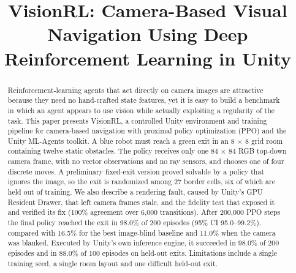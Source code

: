 \documentclass[conference]{IEEEtran}
\begin{document}
\title{VisionRL: Camera-Based Visual Navigation Using Deep Reinforcement Learning in Unity}

\author{
\and
{}
\and
{}
}

\maketitle

\begin{abstract}
Reinforcement-learning agents that act directly on camera images are attractive because they need no hand-crafted state features, yet it is easy to build a benchmark in which an agent appears to use vision while actually exploiting a regularity of the task. This paper presents VisionRL, a controlled Unity environment and training pipeline for camera-based navigation with proximal policy optimization (PPO) and the Unity ML-Agents toolkit. A blue robot must reach a green exit in an 8 $\times$ 8 grid room containing twelve static obstacles. The policy receives only one 84 $\times$ 84 RGB top-down camera frame, with no vector observations and no ray sensors, and chooses one of four discrete moves. A preliminary fixed-exit version proved solvable by a policy that ignores the image, so the exit is randomized among 27 border cells, six of which are held out of training. We also describe a rendering fault, caused by Unity's GPU Resident Drawer, that left camera frames stale, and the fidelity test that exposed it and verified its fix (100\% agreement over 6,000 transitions). After 200,000 PPO steps the final policy reached the exit in 98.0\% of 200 episodes (95\% CI 95.0--99.2\%), compared with 16.5\% for the best image-blind baseline and 11.0\% when the camera was blanked. Executed by Unity's own inference engine, it succeeded in 98.0\% of 200 episodes and in 88.0\% of 100 episodes on held-out exits. Limitations include a single training seed, a single room layout and one difficult held-out exit.
\end{abstract}
\end{document}
